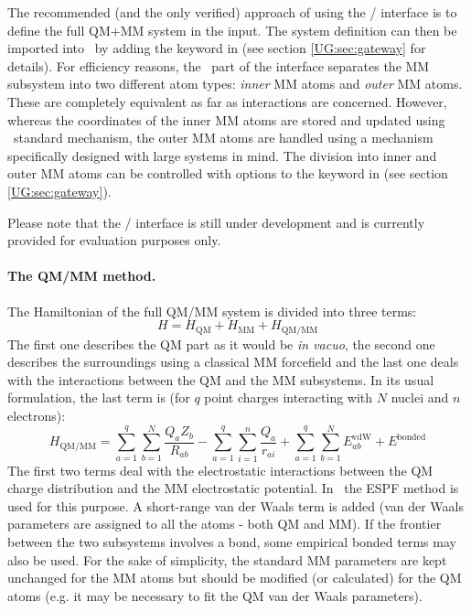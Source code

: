 The recommended (and the only verified) approach of using the \molcas/ interface is to define the full QM+MM system in the  input. The system definition can then be imported into \molcas\ by adding the keyword  in  (see section \ref{UG:sec:gateway} for details). For efficiency reasons, the \molcas\ part of the interface separates the MM subsystem into two different atom types: \emph{inner} MM atoms and \emph{outer} MM atoms. These are completely equivalent as far as interactions are concerned. However, whereas the coordinates of the inner MM atoms are stored and updated using \molcas\ standard mechanism, the outer MM atoms are handled using a mechanism specifically designed with large systems in mind. The division into inner and outer MM atoms can be controlled with options to the  keyword in  (see section \ref{UG:sec:gateway}).

Please note that the \molcas/ interface is still under development and is currently provided for evaluation purposes only.

\paragraph{The QM/MM method.}
The Hamiltonian of the full QM/MM system is divided into three terms:
\begin{equation}
H=H_\mathrm{QM}+H_\mathrm{MM}+H_\mathrm{QM/MM}
\end{equation}
The first one describes the QM part as it would be \textit{in vacuo}, the second one describes the surroundings using a classical MM forcefield and the last one deals with the interactions between the QM and the MM subsystems. In its usual formulation, the last term is (for $q$ point charges interacting with $N$ nuclei and $n$ electrons):
\begin{equation}
H_\mathrm{QM/MM}=\sum_{a=1}^{q}\sum_{b=1}^{N}\frac{Q_{a}Z_{b}}{R_{ab}}-
\sum_{a=1}^{q}\sum_{i=1}^{n}\frac{Q_{a}}{r_{ai}}+\sum_{a=1}^{q}\sum_{b=1}^{N}E_{ab}^\mathrm{vdW}+
E^\mathrm{bonded}
\end{equation}
The first two terms deal with the electrostatic interactions between the QM charge distribution and the MM electrostatic potential. In \molcas\ the ESPF method is used for this purpose. %
A short-range van der Waals term is added (van der Waals parameters are assigned to all the atoms - both QM and MM). If the frontier between the two subsystems involves a bond, some empirical bonded terms may also be used. For the sake of simplicity, the standard MM parameters are kept unchanged for the MM atoms but should be modified (or calculated) for the QM atoms (e.g. it may be necessary to fit the QM van der Waals parameters).

